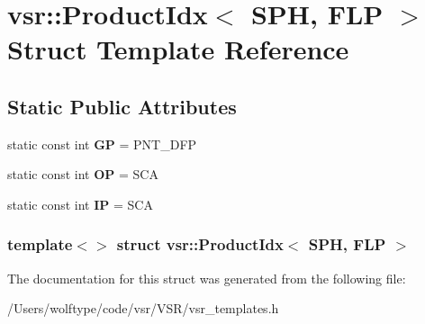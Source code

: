 \hypertarget{structvsr_1_1_product_idx_3_01_s_p_h_00_01_f_l_p_01_4}{\section{vsr\-:\-:Product\-Idx$<$ S\-P\-H, F\-L\-P $>$ Struct Template Reference}
\label{structvsr_1_1_product_idx_3_01_s_p_h_00_01_f_l_p_01_4}
}
\subsection*{Static Public Attributes}
\begin{DoxyCompactItemize}
\item 
\hypertarget{structvsr_1_1_product_idx_3_01_s_p_h_00_01_f_l_p_01_4_a0c690117df28186749fffea7d5d7b8de}{static const int {\bfseries G\-P} = P\-N\-T\-\_\-\-D\-F\-P}\label{structvsr_1_1_product_idx_3_01_s_p_h_00_01_f_l_p_01_4_a0c690117df28186749fffea7d5d7b8de}

\item 
\hypertarget{structvsr_1_1_product_idx_3_01_s_p_h_00_01_f_l_p_01_4_a4c06999ee744d076daeaf14f0f764dd5}{static const int {\bfseries O\-P} = S\-C\-A}\label{structvsr_1_1_product_idx_3_01_s_p_h_00_01_f_l_p_01_4_a4c06999ee744d076daeaf14f0f764dd5}

\item 
\hypertarget{structvsr_1_1_product_idx_3_01_s_p_h_00_01_f_l_p_01_4_a240df935c37195a2a7a30a7e6e405fba}{static const int {\bfseries I\-P} = S\-C\-A}\label{structvsr_1_1_product_idx_3_01_s_p_h_00_01_f_l_p_01_4_a240df935c37195a2a7a30a7e6e405fba}

\end{DoxyCompactItemize}
\subsubsection*{template$<$$>$ struct vsr\-::\-Product\-Idx$<$ S\-P\-H, F\-L\-P $>$}



The documentation for this struct was generated from the following file\-:\begin{DoxyCompactItemize}
\item 
/\-Users/wolftype/code/vsr/\-V\-S\-R/vsr\-\_\-templates.\-h\end{DoxyCompactItemize}
